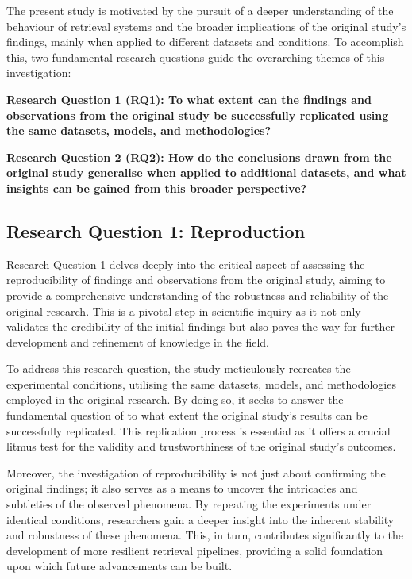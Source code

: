 The present study is motivated by the pursuit of a deeper understanding of the behaviour of retrieval systems and the broader implications of the original study's findings, mainly when applied to different datasets and conditions. To accomplish this, two fundamental research questions guide the overarching themes of this investigation:

\textbf{Research Question 1 (RQ1): To what extent can the findings and observations from the original study be successfully replicated using the same datasets, models, and methodologies?}

\textbf{Research Question 2 (RQ2): How do the conclusions drawn from the original study generalise when applied to additional datasets, and what insights can be gained from this broader perspective?} 

\subsection{Research Question 1: Reproduction}
Research Question 1 delves deeply into the critical aspect of assessing the reproducibility of findings and observations from the original study, aiming to provide a comprehensive understanding of the robustness and reliability of the original research. This is a pivotal step in scientific inquiry as it not only validates the credibility of the initial findings but also paves the way for further development and refinement of knowledge in the field.

To address this research question, the study meticulously recreates the experimental conditions, utilising the same datasets, models, and methodologies employed in the original research. By doing so, it seeks to answer the fundamental question of to what extent the original study's results can be successfully replicated. This replication process is essential as it offers a crucial litmus test for the validity and trustworthiness of the original study's outcomes.

Moreover, the investigation of reproducibility is not just about confirming the original findings; it also serves as a means to uncover the intricacies and subtleties of the observed phenomena. By repeating the experiments under identical conditions, researchers gain a deeper insight into the inherent stability and robustness of these phenomena. This, in turn, contributes significantly to the development of more resilient retrieval pipelines, providing a solid foundation upon which future advancements can be built.

